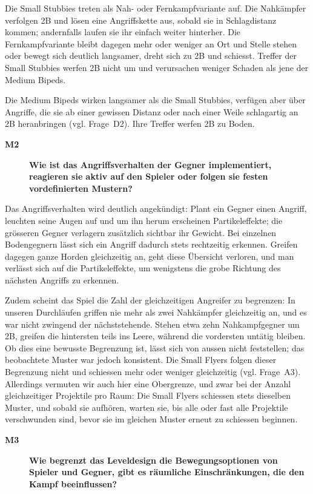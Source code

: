 \documentclass[../Main.tex]{subfiles}
\begin{document}
Die Small Stubbies treten als Nah- oder Fernkampfvariante auf. Die Nahkämpfer verfolgen 2B und lösen eine Angriffskette aus, sobald sie in Schlagdistanz kommen; andernfalls laufen sie ihr einfach weiter hinterher. Die Fernkampfvariante bleibt dagegen mehr oder weniger an Ort und Stelle stehen oder bewegt sich deutlich langsamer, dreht sich zu 2B und schiesst. Treffer der Small Stubbies werfen 2B nicht um und verursachen weniger Schaden als jene der Medium Bipeds.

Die Medium Bipeds wirken langsamer als die Small Stubbies, verfügen aber über Angriffe, die sie ab einer gewissen Distanz oder nach einer Weile schlagartig an 2B heranbringen (vgl. Frage~D2). Ihre Treffer werfen 2B zu Boden.

\begin{description}
    \item[\textbf{M2}] \textbf{Wie ist das Angriffsverhalten der Gegner implementiert, reagieren sie aktiv auf den Spieler oder folgen sie festen vordefinierten Mustern?}
\end{description}

Das Angriffsverhalten wird deutlich angekündigt: Plant ein Gegner einen Angriff, leuchten seine Augen auf und um ihn herum erscheinen Partikeleffekte; die grösseren Gegner verlagern zusätzlich sichtbar ihr Gewicht. Bei einzelnen Bodengegnern lässt sich ein Angriff dadurch stets rechtzeitig erkennen. Greifen dagegen ganze Horden gleichzeitig an, geht diese Übersicht verloren, und man verlässt sich auf die Partikeleffekte, um wenigstens die grobe Richtung des nächsten Angriffs zu erkennen.

Zudem scheint das Spiel die Zahl der gleichzeitigen Angreifer zu begrenzen: In unseren Durchläufen griffen nie mehr als zwei Nahkämpfer gleichzeitig an, und es war nicht zwingend der nächststehende. Stehen etwa zehn Nahkampfgegner um 2B, greifen die hintersten teils ins Leere, während die vordersten untätig bleiben. Ob dies eine bewusste Begrenzung ist, lässt sich von aussen nicht feststellen; das beobachtete Muster war jedoch konsistent. Die Small Flyers folgen dieser Begrenzung nicht und schiessen mehr oder weniger gleichzeitig (vgl. Frage~A3). Allerdings vermuten wir auch hier eine Obergrenze, und zwar bei der Anzahl gleichzeitiger Projektile pro Raum: Die Small Flyers schiessen stets dieselben Muster, und sobald sie aufhören, warten sie, bis alle oder fast alle Projektile verschwunden sind, bevor sie im gleichen Muster erneut zu schiessen beginnen.

\begin{description}
    \item[\textbf{M3}] \textbf{Wie begrenzt das Leveldesign die Bewegungsoptionen von Spieler und Gegner, gibt es räumliche Einschränkungen, die den Kampf beeinflussen?}
\end{description}
\end{document}
